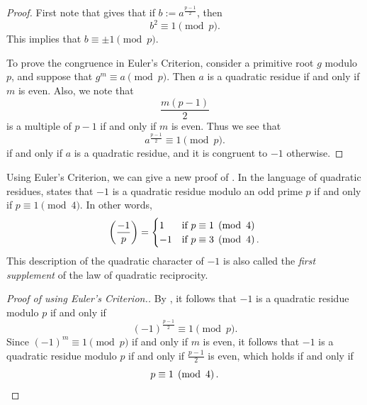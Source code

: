 \begin{proof}
  First note that  gives that if $b:=a^{\frac{p-1}{2}}$, then
  \begin{equation*}
    b^2\equiv 1\pmod{p}.
  \end{equation*}
  This implies that $b\equiv\pm1\pmod{p}$.
  
  To prove the congruence in Euler's Criterion, consider a primitive root $g$ modulo $p$, and suppose that $g^m\equiv a\pmod{p}$. Then $a$ is a quadratic residue if and only if $m$ is even. Also, we note that
  \begin{equation*}
    \frac{m(p-1)}{2}
  \end{equation*}
  is a multiple of $p-1$ if and only if $m$ is even. Thus we see that
  \begin{equation*}
    a^{\frac{p-1}{2}}\equiv 1\pmod{p}.
  \end{equation*}
  if and only if $a$ is a quadratic residue, and it is congruent to $-1$ otherwise.
\end{proof}

Using Euler's Criterion, we can give a new proof of . In the language of quadratic residues,  states that $-1$ is a quadratic residue modulo an odd prime $p$ if and only if $p\equiv 1\pmod{4}$. In other words,
\begin{equation*}
  \legendre{-1}{p}= 
  \begin{cases}
    1 & \text{if }p\equiv 1\pmod{4} \\
    -1 & \text{if }p\equiv 3\pmod{4}.
  \end{cases}
\end{equation*}
This description of the quadratic character of $-1$ is also called the \emph{first supplement} of the law of quadratic reciprocity.

\begin{proof}[Proof of  using Euler's Criterion.]
  By , it follows that $-1$ is a quadratic residue modulo $p$ if and only if
  \begin{equation*}
    (-1)^{\frac{p-1}{2}}\equiv 1\pmod{p}.
  \end{equation*}
  Since $(-1)^m\equiv 1\pmod{p}$ if and only if $m$ is even, it follows that $-1$ is a quadratic residue modulo $p$ if and only if $\frac{p-1}{2}$ is even, which holds if and only if
  \begin{equation*}
    p\equiv 1\pmod{4}.\qedhere
  \end{equation*}
\end{proof}

